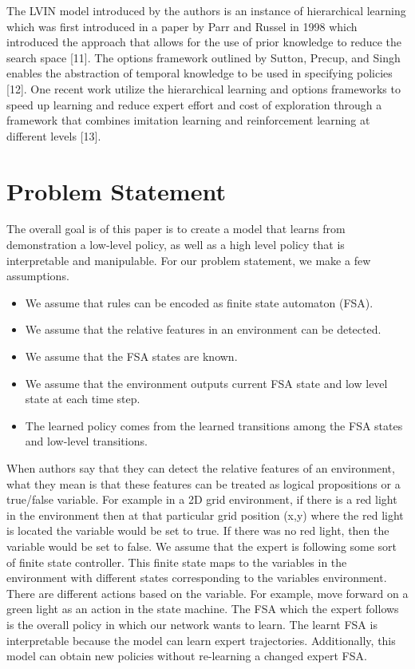 \documentclass[letterpaper, 10 pt, conference]{ieeeconf}  %
\begin{document}
The LVIN model introduced by the authors is an instance of hierarchical learning which was first introduced in a paper by Parr and Russel in 1998 which introduced the approach that allows for the use of prior knowledge to reduce the search space [11]. The options framework outlined by Sutton, Precup, and Singh enables the abstraction of temporal knowledge to be used in specifying policies [12]. One recent work utilize the hierarchical learning and options frameworks to speed up learning and reduce expert effort and cost of exploration through a framework that combines imitation learning and reinforcement learning at different levels [13].

\section{Problem Statement}
The overall goal is of this paper is to create a model that learns from demonstration a low-level policy, as well as a high level policy that is interpretable and manipulable. For our problem statement, we make a few assumptions. 
\begin{itemize}
  \item We assume that rules can be encoded as finite state automaton (FSA). 
  \item We assume that the relative features in an environment can be detected.
  \item We assume that the FSA states are known.
  \item We assume that the environment outputs current FSA state and low level state at each time step.
  \item The learned policy comes from the learned transitions among the FSA states and low-level transitions.
\end{itemize}

When authors say that they can detect the relative features of an environment, what they mean is that these features can be treated as logical propositions or a true/false variable. For example in a 2D grid environment, if there is a red light in the environment then at that particular grid position (x,y) where the red light is located the variable would be set to true. If there was no red light, then the variable would be set to false.
\newline
\indent We assume that the expert is following some sort of finite state controller. This finite state maps to the variables in the environment with different states corresponding to the variables environment. There are different actions based on the variable. For example, move forward on a green light as an action in the state machine. The FSA which the expert follows is the overall policy in which our network wants to learn. The learnt FSA is interpretable because the model can learn expert trajectories. Additionally, this model can obtain new policies without re-learning a changed expert FSA.
\end{document}
